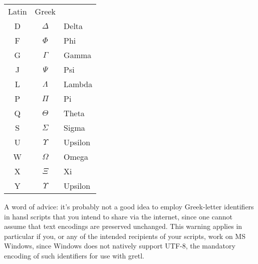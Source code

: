 \begin{center}
  \begin{tabular}{ccl}
    Latin & Greek \\[4pt]
    D & $\Delta$ & Delta \\
    F & $\Phi$ & Phi \\
    G & $\Gamma$ & Gamma \\
    J & $\Psi$ & Psi\\
    L & $\Lambda$ & Lambda \\
    P & $\Pi$ & Pi \\
    Q & $\Theta$ & Theta \\
    S & $\Sigma$ & Sigma \\
    U & $\Upsilon$ & Upsilon \\
    W & $\Omega$ & Omega \\
    X & $\Xi$  & Xi \\
    Y & $\Upsilon$ & Upsilon \\
  \end{tabular}
\end{center}

A word of advice: it's probably not a good idea to employ Greek-letter
identifiers in hansl scripts that you intend to share via the
internet, since one cannot assume that text encodings are preserved
unchanged. This warning applies in particular if you, or any of the
intended recipients of your scripts, work on MS Windows, since Windows
does not natively support UTF-8, the mandatory encoding of such
identifiers for use with gretl.
